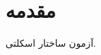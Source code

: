 \documentclass[12pt,a4paper]{report}
\begin{document}
\chapter{مقدمه}
آزمون ساختار اسکلتی.
\end{document}

